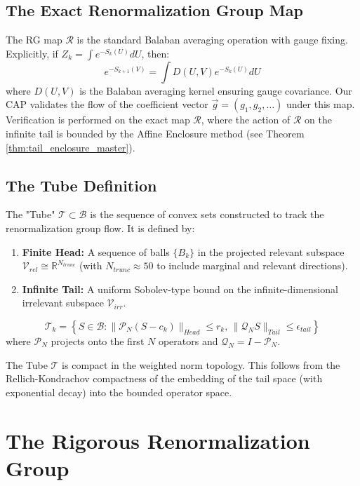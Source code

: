 \subsection{The Exact Renormalization Group Map}
The RG map $\mathcal{R}$ is the standard Balaban averaging operation with gauge fixing. Explicitly, if $Z_k = \int e^{-S_k(U)} dU$, then:
\begin{equation}
    e^{-S_{k+1}(V)} = \int D(U,V) e^{-S_k(U)} dU
\end{equation}
where $D(U,V)$ is the Balaban averaging kernel ensuring gauge covariance. 
Our CAP validates the flow of the coefficient vector $\vec{g} = (g_1, g_2, \dots)$ under this map.
Verification is performed on the exact map $\mathcal{R}$, where the action of $\mathcal{R}$ on the infinite tail is bounded by the Affine Enclosure method (see Theorem \ref{thm:tail_enclosure_master}).

\subsection{The Tube Definition}
\label{def:tube_strict_master}
The "Tube" $\mathcal{T} \subset \mathcal{B}$ is the sequence of convex sets constructed to track the renormalization group flow. It is defined by:
\begin{enumerate}
    \item \textbf{Finite Head:} A sequence of balls $\{B_k\}$ in the projected relevant subspace $\mathcal{V}_{rel} \cong \mathbb{R}^{N_{trunc}}$ (with $N_{trunc} \approx 50$ to include marginal and relevant directions).
    \item \textbf{Infinite Tail:} A uniform Sobolev-type bound on the infinite-dimensional irrelevant subspace $\mathcal{V}_{irr}$.
\end{enumerate}

\[
\mathcal{T}_k = \left\{ S \in \mathcal{B} : \|\mathcal{P}_{N} (S - c_k) \|_{Head} \le r_k, \, \|\mathcal{Q}_{N} S\|_{Tail} \le \epsilon_{tail} \right\}
\]
where $\mathcal{P}_N$ projects onto the first $N$ operators and $\mathcal{Q}_N = I - \mathcal{P}_N$.

\begin{lemma}[Compactness]
The Tube $\mathcal{T}$ is compact in the weighted norm topology. This follows from the Rellich-Kondrachov compactness of the embedding of the tail space (with exponential decay) into the bounded operator space.
\end{lemma}

\section{The Rigorous Renormalization Group}

